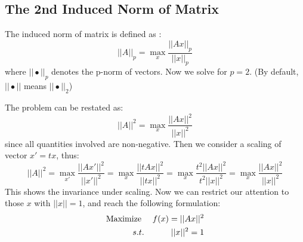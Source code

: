 \subsection{The 2nd Induced Norm of Matrix}

The induced norm of matrix is defined as \cite{wiki_norm}:
\begin{equation}
	||A||_p = \max_{x}{\frac{||Ax||_p}{||x||_p}}
\end{equation}
where $||\bullet||_p$ denotes the p-norm of vectors. Now we solve 
for $p=2$. (By default, $||\bullet||$ means $||\bullet||_2$)

The problem can be restated as:
\begin{equation}
	||A||^2 = \max_{x}{\frac{||Ax||^2}{||x||^2}}
\end{equation}
since all quantities involved are non-negative. Then we consider a 
scaling of vector $x' = tx$, thus:
\begin{equation}
	||A||^2 = \max_{x'}{\frac{||Ax'||^2}{||x'||^2}} 
	=\max_{x}{\frac{||tAx||^2}{||tx||^2}}
	=\max_{x}{\frac{t^2||Ax||^2}{t^2||x||^2}}
	=\max_{x}{\frac{||Ax||^2}{||x||^2}}
\end{equation}
This shows the invariance under scaling. Now we can restrict our attention 
to those $x$ with $||x||=1$, and reach the following formulation:
\begin{eqnarray}
	\mathrm{Maximize~} && f(x) = ||Ax||^2 \\
	s.t. && ||x||^2 = 1
\end{eqnarray}

